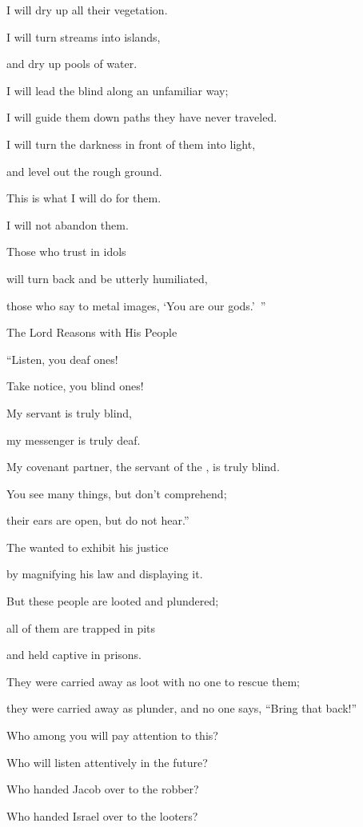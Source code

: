 {\par }{\Q I will dry up
all
their vegetation.
\par }{\Q I will turn
streams
into islands,
\par }{\Q and dry up
pools of water.
\par }{\Q {}I will lead
the blind
along an unfamiliar
way;
\par }{\Q I will guide
them down paths
they have never
traveled.
\par }{\Q I will turn
the darkness
in front
of them into light,
\par }{\Q and level
out the rough ground.
\par }{\Q This
is what
I will do
for them.
\par }{\Q I will not
abandon them.
\par }{\Q {}Those who trust
in idols
\par }{\Q will turn
back
and be utterly humiliated,
\par }{\Q those who say
to metal images,
‘You
are our gods.’ ”
\par }{\SH The Lord Reasons with His People
\par }{\Q {}“Listen,
you deaf
ones!
\par }{\Q Take notice,
you blind ones!
\par }{\Q {}My servant
is truly
blind,
\par }{\Q my messenger
is truly
deaf.
\par }{\Q My covenant partner, the servant
of the {}, is truly
blind.
\par }{\Q {}You see
many
things, but don’t
comprehend;
\par }{\Q their ears
are open,
but do not
hear.”
\par }{\Q {}The
{}
wanted
to exhibit
his justice
\par }{\Q by magnifying
his law
and displaying it.
\par }{\Q {}But
these people
are looted
and plundered;
\par }{\Q all
of them are trapped
in pits
\par }{\Q and held captive
in prisons.
\par }{\Q They were carried away
as loot
with no one
to rescue
them;
\par }{\Q they were carried away as plunder,
and no one
says,
“Bring
that back!”
\par }{\Q {}Who
among you will pay attention
to this?
\par }{\Q Who will listen
attentively
in the future?
\par }{\Q {}Who
handed
Jacob
over to the robber?
\par }{\Q Who handed Israel
over to the looters?

}
